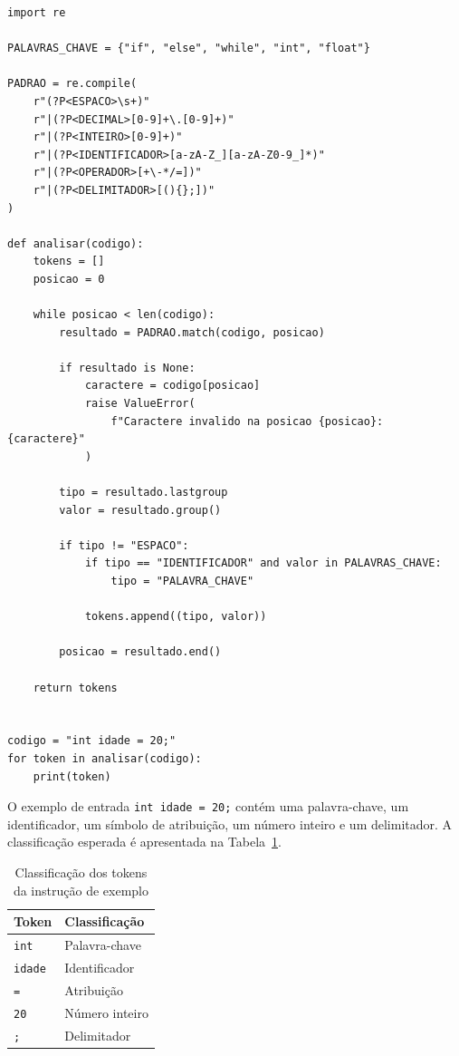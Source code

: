 \documentclass[12pt,a4paper]{article}
\begin{document}
\begin{lstlisting}[caption={Implementação simplificada do analisador léxico da MiniLang.},label={lst:lexer}]
import re

PALAVRAS_CHAVE = {"if", "else", "while", "int", "float"}

PADRAO = re.compile(
    r"(?P<ESPACO>\s+)"
    r"|(?P<DECIMAL>[0-9]+\.[0-9]+)"
    r"|(?P<INTEIRO>[0-9]+)"
    r"|(?P<IDENTIFICADOR>[a-zA-Z_][a-zA-Z0-9_]*)"
    r"|(?P<OPERADOR>[+\-*/=])"
    r"|(?P<DELIMITADOR>[(){};])"
)

def analisar(codigo):
    tokens = []
    posicao = 0

    while posicao < len(codigo):
        resultado = PADRAO.match(codigo, posicao)

        if resultado is None:
            caractere = codigo[posicao]
            raise ValueError(
                f"Caractere invalido na posicao {posicao}: {caractere}"
            )

        tipo = resultado.lastgroup
        valor = resultado.group()

        if tipo != "ESPACO":
            if tipo == "IDENTIFICADOR" and valor in PALAVRAS_CHAVE:
                tipo = "PALAVRA_CHAVE"

            tokens.append((tipo, valor))

        posicao = resultado.end()

    return tokens


codigo = "int idade = 20;"
for token in analisar(codigo):
    print(token)
\end{lstlisting}

O exemplo de entrada \texttt{int idade = 20;} contém uma palavra-chave,
um identificador, um símbolo de atribuição, um número inteiro e um
delimitador. A classificação esperada é apresentada na
Tabela~\ref{tab:exemplo}.

\begin{table}[H]
\centering
\caption{Classificação dos tokens da instrução de exemplo}
\label{tab:exemplo}
\begin{tabular}{ll}
\toprule
\textbf{Token} & \textbf{Classificação} \\
\midrule
\texttt{int} & Palavra-chave \\
\texttt{idade} & Identificador \\
\texttt{=} & Atribuição \\
\texttt{20} & Número inteiro \\
\texttt{;} & Delimitador \\
\bottomrule
\end{tabular}
\end{table}
\end{document}
